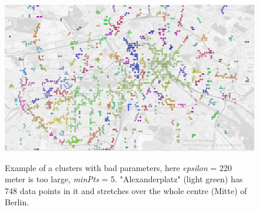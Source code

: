 \begin{figure}[!ht]
	\centering
	\includegraphics[width=1\textwidth]{images/0,002_5_gray.png}\\
	\caption{ Example of a clusters with bad parameters, here \textit{epsilon} = 220 meter is too large, \textit{minPts} = 5. "Alexanderplatz" (light green) has 748 data points in it and stretches over the whole centre (Mitte) of Berlin. }
	\label{fig:002_5_gray}
\end{figure}